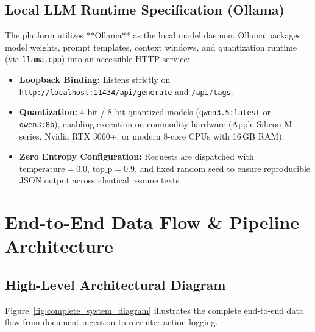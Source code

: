 \documentclass[11pt,a4paper]{report}
\begin{document}
\section{Local LLM Runtime Specification (Ollama)}
The platform utilizes **Ollama** as the local model daemon. Ollama packages model weights, prompt templates, context windows, and quantization runtime (via \texttt{llama.cpp}) into an accessible HTTP service:
\begin{itemize}[leftmargin=1.5em]
    \item \textbf{Loopback Binding:} Listens strictly on \texttt{http://localhost:11434/api/generate} and \texttt{/api/tags}.
    \item \textbf{Quantization:} 4-bit / 8-bit quantized models (\texttt{qwen3.5:latest} or \texttt{qwen3:8b}), enabling execution on commodity hardware (Apple Silicon M-series, Nvidia RTX 3060+, or modern 8-core CPUs with 16\,GB RAM).
    \item \textbf{Zero Entropy Configuration:} Requests are dispatched with $\text{temperature} = 0.0$, $\text{top\_p} = 0.9$, and fixed random seed to ensure reproducible JSON output across identical resume texts.
\end{itemize}

\chapter{End-to-End Data Flow \& Pipeline Architecture}

\section{High-Level Architectural Diagram}
Figure~\ref{fig:complete_system_diagram} illustrates the complete end-to-end data flow from document ingestion to recruiter action logging.
\end{document}

